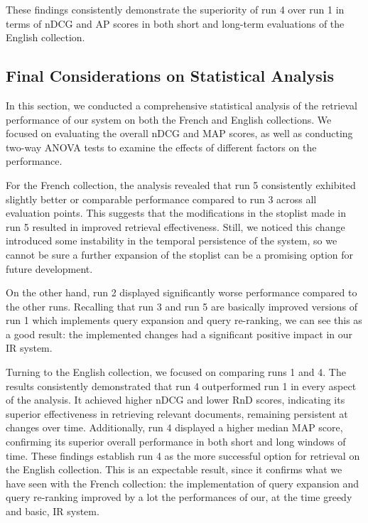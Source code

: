 These findings consistently demonstrate the superiority of run 4 over run 1 in terms of \ac{nDCG} and \ac{AP} scores in both short and long-term evaluations of the English collection.


\newpage
\enlargethispage{4\baselineskip}
\subsection{Final Considerations on Statistical Analysis}

In this section, we conducted a comprehensive statistical analysis of the retrieval performance of our system on both the French and English collections. 
We focused on evaluating the overall \ac{nDCG} and \ac{MAP} scores, as well as conducting two-way \ac{ANOVA} tests to examine the effects of different factors on the performance.

For the French collection, the analysis revealed that run 5 consistently exhibited slightly better or comparable performance compared to run 3 across all evaluation points. 
This suggests that the modifications in the stoplist made in run 5 resulted in improved retrieval effectiveness.
Still, we noticed this change introduced some instability in the temporal persistence of the system, so we cannot be sure a further expansion of the stoplist can be a promising option for future development. 

On the other hand, run 2 displayed significantly worse performance compared to the other runs. 
Recalling that run 3 and run 5 are basically improved versions of run 1 which implements query expansion and query re-ranking, we can see this as a good result: the implemented changes had a significant positive impact in our \ac{IR} system.  

Turning to the English collection, we focused on comparing runs 1 and 4. 
The results consistently demonstrated that run 4 outperformed run 1 in every aspect of the analysis. 
It achieved higher \ac{nDCG} and lower \ac{RnD} scores, indicating its superior effectiveness in retrieving relevant documents, remaining persistent at changes over time. 
Additionally, run 4 displayed a higher median \ac{MAP} score, confirming its superior overall performance in both short and long windows of time. 
These findings establish run 4 as the more successful option for retrieval on the English collection.
This is an expectable result, since it confirms what we have seen with the French collection: the implementation of query expansion and query re-ranking improved by a lot the performances of our, at the time greedy and basic, \ac{IR} system. 

